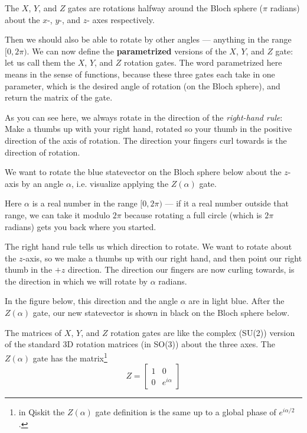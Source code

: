 \documentclass{article}
\theoremstyle{definition}
\begin{document}
The $X$, $Y$, and $Z$ gates are rotations halfway around the Bloch sphere ($\pi$ radians) about the $x$-, $y$-, and $z$- axes respectively.

Then we should also be able to rotate by other angles --- anything in the range $[0,2\pi)$.
We can now define the \textbf{parametrized} versions of the $X$, $Y$, and $Z$ gate: let us call them the $X$, $Y$, and $Z$ rotation gates.
The word parametrized here means in the sense of functions, because these three gates each take in one parameter, which is the desired angle of rotation (on the Bloch sphere), and return the matrix of the gate.
\begin{figure}[H]
\end{figure}
As you can see here, we always rotate in the direction of the \textit{right-hand rule}: Make a thumbs up with your right hand, rotated so your thumb in the positive direction of the axis of rotation.  The direction your fingers curl towards is the direction of rotation.

\newpage
\begin{example}
We want to rotate the blue statevector on the Bloch sphere below about the $z$-axis by an angle $\alpha$, i.e. visualize applying the $Z(\alpha)$ gate.

\textnormal{Here $\alpha$ is a real number in the range $[0,2\pi)$ --- if it a real number outside that range, we can take it modulo $2\pi$ because rotating a full circle (which is $2\pi$ radians) gets you back where you started.}

\textnormal{The right hand rule tells us which direction to rotate.  We want to rotate about the $z$-axis, so we make a thumbs up with our right hand, and then point our right thumb in the $+z$ direction.  The direction our fingers are now curling towards, is the direction in which we will rotate by $\alpha$ radians.}

\textnormal{In the figure below, this direction and the angle $\alpha$ are in light blue.  After the $Z(\alpha)$ gate, our new statevector is shown in black on the Bloch sphere below.}
\begin{figure}[H]
\end{figure}
\end{example}

The matrices of $X$, $Y$, and $Z$ rotation gates are like the complex (SU(2)) version of the standard 3D rotation matrices (in SO(3)) about the three axes.
The $Z(\alpha)$ gate has the matrix\footnote{in Qiskit the $Z(\alpha)$ gate definition is the same up to a global phase of $e^{i\alpha/2}$.}
\begin{equation}
	Z = \begin{bmatrix}
		1 & 0\\
		0 & e^{i\alpha}
	\end{bmatrix}
\end{equation}
\end{document}
